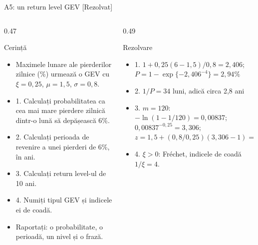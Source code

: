 \begin{frame}{A5: un return level GEV [Rezolvat]}
\itemsize{\scriptsize}
\begin{columns}[T]
\begin{column}{0.47\textwidth}
\begin{block}{Cerință}
\begin{itemize}
    \item Maximele lunare ale pierderilor zilnice (\%) urmează o GEV cu $\xi = 0{,}25$, $\mu = 1{,}5$, $\sigma = 0{,}8$.
    \item 1. Calculați probabilitatea ca cea mai mare pierdere zilnică dintr-o lună să depășească 6\%.
    \item 2. Calculați perioada de revenire a unei pierderi de 6\%, în ani.
    \item 3. Calculați return level-ul de 10 ani.
    \item 4. Numiți tipul GEV și indicele ei de coadă.
    \item Raportați: o probabilitate, o perioadă, un nivel și o frază.
\end{itemize}
\end{block}
\end{column}
\begin{column}{0.49\textwidth}
\begin{exampleblock}{Rezolvare}
\begin{itemize}
    \item 1. $1 + 0{,}25(6 - 1{,}5)/0{,}8 = 2{,}406$; $P = 1 - \exp\{-2{,}406^{-4}\} = 2{,}94\%$
    \item 2. $1/P = 34$ luni, adică circa 2{,}8 ani
    \item 3. $m = 120$: $-\ln(1 - 1/120) = 0{,}00837$; $0{,}00837^{-0{,}25} = 3{,}306$; $z = 1{,}5 + (0{,}8/0{,}25)(3{,}306 - 1) = 8{,}88\%$
    \item 4. $\xi > 0$: Fréchet, indicele de coadă $1/\xi = 4$.
\end{itemize}
\end{exampleblock}
\end{column}
\end{columns}
\end{frame}


